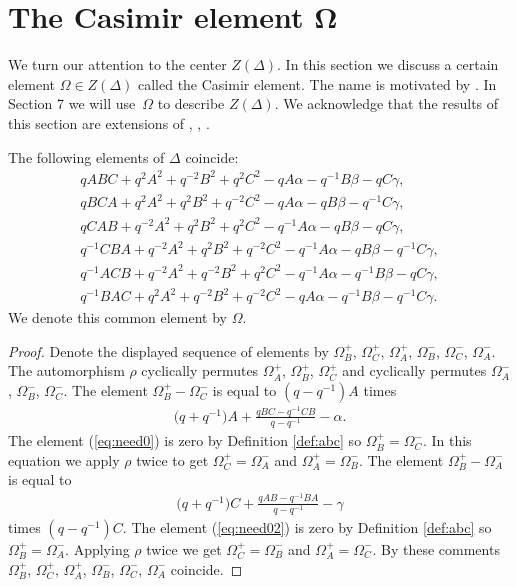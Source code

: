 \section[The Casimir element $\Omega$]{The Casimir element $\boldsymbol{\Omega}$}

We turn our attention to the center $Z(\Delta)$.
In this section we discuss a certain
 element $\Omega \in Z(\Delta)$
 called the Casimir element.
The name is
motivated by
\cite[equation~(1.3)]{Zhidd}.
 In Section 7
we will use~$\Omega$ to describe
$Z(\Delta)$.
We acknowledge that the results of this section are
extensions of
\cite[Lemma~1]{posta2},
\cite[Section~6]{koro},
\cite[equation~(1.3)]{Zhidd}.

\begin{Lemma}
\label{lem:six}
The following elements of $\Delta $ coincide:
\begin{gather*}
qABC + q^2A^2+q^{-2}B^2+q^2C^2-q A\alpha -q^{-1} B\beta -q C\gamma,
\\
qBCA +
q^2A^2 +
q^2B^2+q^{-2}C^2
-q A\alpha
-qB\beta -q^{-1}C\gamma,
\\
qCAB +
q^{-2}A^2+q^2B^2
+q^2 C^2
-q^{-1} A\alpha -q B \beta
-q C\gamma,
\\
q^{-1}CBA + q^{-2}A^2+q^{2}B^2+q^{-2}C^2-q^{-1}A\alpha -q B\beta -
q^{-1} C\gamma,
\\
q^{-1}ACB +
q^{-2}A^2 +
q^{-2}B^2+q^{2}C^2
-q^{-1} A\alpha
-q^{-1}B\beta -q C\gamma,
\\
q^{-1}BAC +
q^{2}A^2+q^{-2}B^2
+q^{-2}C^2
-q A\alpha
-q^{-1} B \beta
-q^{-1} C\gamma.
\end{gather*}
We denote this common element by $\Omega$.
\end{Lemma}

\begin{proof}
Denote the displayed sequence of elements by
$\Omega^+_B$,
$\Omega^+_C$,
$\Omega^+_A$,
$\Omega^-_B$,
$\Omega^-_C$,
$\Omega^-_A$.
The automorphism
$\rho$ cyclically permutes
$\Omega^+_A$,
$\Omega^+_B$,
$\Omega^+_C$
and cyclically permutes
$\Omega^-_A$, $\Omega^-_B$, $\Omega^-_C$.
The element
$\Omega^+_B-\Omega^-_C$
is
equal to $(q-q^{-1})A$ times
\begin{gather}
\label{eq:need0}
\big(q+q^{-1}\big)A + \frac{qBC-q^{-1}CB}{q-q^{-1}} -\alpha.
\end{gather}
The element
(\ref{eq:need0}) is zero by Def\/inition
\ref{def:abc} so
$\Omega^+_B=\Omega^-_C$.
In this equation we apply $\rho$ twice to get
$\Omega^+_C=\Omega^-_A$
and
$\Omega^+_A=\Omega^-_B$.
The element
$\Omega^+_B-\Omega^-_A$ is equal to
\begin{gather}
\label{eq:need02}
\big(q+q^{-1}\big)C + \frac{qAB-q^{-1}BA}{q-q^{-1}} -\gamma
\end{gather}
times $(q-q^{-1})C$.
The element
(\ref{eq:need02}) is zero by Def\/inition
\ref{def:abc} so
$\Omega^+_B=\Omega^-_A$.
Applying $\rho$ twice we get
$\Omega^+_C=\Omega^-_B$
and
$\Omega^+_A=\Omega^-_C$.
By these comments
$\Omega^+_B$,
$\Omega^+_C$,
$\Omega^+_A$,
$\Omega^-_B$,
$\Omega^-_C$,
$\Omega^-_A$ coincide.
\end{proof}

